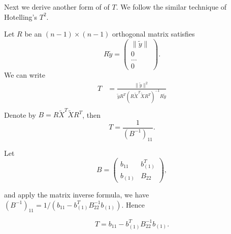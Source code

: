

Next we derive another form of of $T$. We follow the similar technique of Hotelling's $T^2$.


Let $R$ be an $(n-1)\times (n-1)$ orthogonal matrix satisfies 
\[
    R\tilde{y}=
    \begin{pmatrix}
        \|\tilde{y}\|\\
        0\\
        \ldots\\
        0
    \end{pmatrix}.
    \]
We can write
    \begin{equation}\label{Tformula}
        \begin{aligned}
            T&=\frac{\|\tilde{y}\|^2
        }{\tilde{y}R^T{(R\tilde{X}^T\tilde{X}R^T)}^{-1}R\tilde{y}}\\
        \end{aligned}
    \end{equation}
Denote by $B=R\tilde{X}^T \tilde{X} R^T$, then
\[
    T=\frac{1}{{(B^{-1})}_{11}}.
    \]

Let
\[
    B=\begin{pmatrix} 
        b_{11} & b_{(1)}^T\\
        b_{(1)} & B_{22}
    \end{pmatrix},
    \]

and apply the matrix inverse formula, we have ${(B^{-1})}_{11}=1/(b_{11}-b_{(1)}^T B_{22}^{-1}b_{(1)})$. Hence

\[
   T= b_{11}-b_{(1)}^T B_{22}^{-1}b_{(1)}.
    \]
